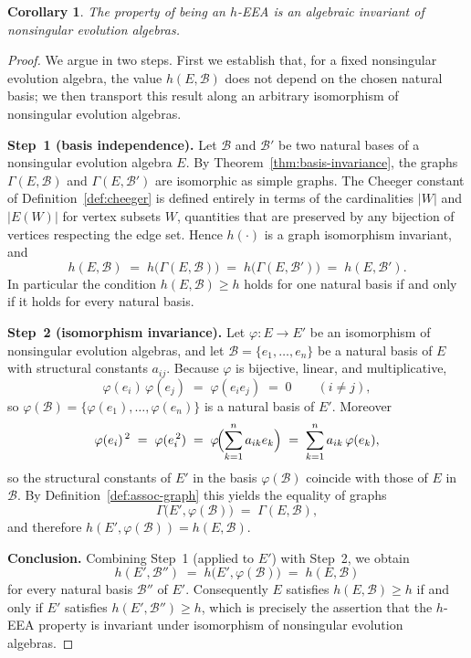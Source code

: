 \documentclass[12pt,a4paper]{amsart}
\newtheorem{corollary}[theorem]{Corollary}
\theoremstyle{definition}
\newcommand{\hh}{h}          %
\newcommand{\EA}{E}          %
\newcommand{\natbasis}{\mathcal{B}}  %
\begin{document}
\begin{corollary}\label{cor:EEA-invariant}
The property of being an $h$-EEA is an algebraic invariant of
nonsingular evolution algebras.
\end{corollary}

\begin{proof}
We argue in two steps.  First we establish that, for a fixed nonsingular
evolution algebra, the value $\hh(\EA,\natbasis)$ does not depend on the
chosen natural basis; we then transport this result along an arbitrary
isomorphism of nonsingular evolution algebras.

\medskip
\noindent\textbf{Step~1 (basis independence).}
Let $\natbasis$ and $\natbasis'$ be two natural bases of a nonsingular
evolution algebra $\EA$.  By
Theorem~\ref{thm:basis-invariance}, the graphs
$\varGamma(\EA,\natbasis)$ and $\varGamma(\EA,\natbasis')$ are
isomorphic as simple graphs.  The Cheeger constant of
Definition~\ref{def:cheeger} is defined entirely in terms of the
cardinalities $|W|$ and $|E(W)|$ for vertex subsets $W$, quantities
that are preserved by any bijection of vertices respecting the edge
set.  Hence $\hh(\cdot)$ is a graph isomorphism invariant, and
\[
  \hh(\EA,\natbasis)
  \;=\;\hh\bigl(\varGamma(\EA,\natbasis)\bigr)
  \;=\;\hh\bigl(\varGamma(\EA,\natbasis')\bigr)
  \;=\;\hh(\EA,\natbasis').
\]
In particular the condition $\hh(\EA,\natbasis)\ge h$ holds for one
natural basis if and only if it holds for every natural basis.

\medskip
\noindent\textbf{Step~2 (isomorphism invariance).}
Let $\varphi\colon\EA\to\EA'$ be an isomorphism of nonsingular
evolution algebras, and let $\natbasis=\{e_1,\ldots,e_n\}$ be a natural
basis of $\EA$ with structural constants $a_{ij}$.  Because $\varphi$
is bijective, linear, and multiplicative,
\[
  \varphi(e_i)\,\varphi(e_j)
  \;=\;\varphi(e_ie_j)
  \;=\;0
  \qquad (i\ne j),
\]
so $\varphi(\natbasis)=\{\varphi(e_1),\ldots,\varphi(e_n)\}$ is a
natural basis of $\EA'$.  Moreover
\[
  \varphi(e_i)^{\,2}
  \;=\;\varphi(e_i^{\,2})
  \;=\;\varphi\!\Bigl(\sum_{k=1}^{n}a_{ik}e_k\Bigr)
  \;=\;\sum_{k=1}^{n}a_{ik}\,\varphi(e_k),
\]
so the structural constants of $\EA'$ in the basis $\varphi(\natbasis)$
coincide with those of $\EA$ in $\natbasis$.  By
Definition~\ref{def:assoc-graph} this yields the equality of graphs
\[
  \varGamma\bigl(\EA',\varphi(\natbasis)\bigr)
  \;=\;
  \varGamma(\EA,\natbasis),
\]
and therefore $\hh(\EA',\varphi(\natbasis))=\hh(\EA,\natbasis)$.

\medskip
\noindent\textbf{Conclusion.}
Combining Step~1 (applied to $\EA'$) with Step~2, we obtain
\[
  \hh(\EA',\natbasis'')
  \;=\;\hh\bigl(\EA',\varphi(\natbasis)\bigr)
  \;=\;\hh(\EA,\natbasis)
\]
for every natural basis $\natbasis''$ of $\EA'$.  Consequently $\EA$
satisfies $\hh(\EA,\natbasis)\ge h$ if and only if $\EA'$ satisfies
$\hh(\EA',\natbasis'')\ge h$, which is precisely the assertion that
the $h$-EEA property is invariant under isomorphism of nonsingular
evolution algebras.
\end{proof}
\end{document}
